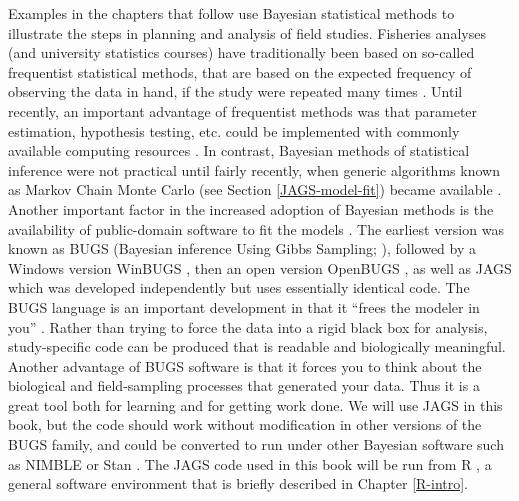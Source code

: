 \documentclass[
]{krantz}
\begin{document}
Examples in the chapters that follow use Bayesian statistical methods to illustrate the steps in planning and analysis of field studies. Fisheries analyses (and university statistics courses) have traditionally been based on so-called frequentist statistical methods, that are based on the expected frequency of observing the data in hand, if the study were repeated many times \citep{mccarthy2007}. Until recently, an important advantage of frequentist methods was that parameter estimation, hypothesis testing, etc. could be implemented with commonly available computing resources \citep{dorazio_2016}. In contrast, Bayesian methods of statistical inference were not practical until fairly recently, when generic algorithms known as Markov Chain Monte Carlo (see Section \ref{JAGS-model-fit}) became available \citep{dorazio_2016}. Another important factor in the increased adoption of Bayesian methods is the availability of public-domain software to fit the models \citep{kery.schaub_2011}. The earliest version was known as BUGS (Bayesian inference Using Gibbs Sampling; \citet{lunn.etal2009}), followed by a Windows version WinBUGS \citep{lunn.etal2000}, then an open version OpenBUGS \citep{lunn.etal2009}, as well as JAGS \citep{plummer2003} which was developed independently but uses essentially identical code. The BUGS language is an important development in that it ``frees the modeler in you'' \citep{kery_2010}. Rather than trying to force the data into a rigid black box for analysis, study-specific code can be produced that is readable and biologically meaningful. Another advantage of BUGS software is that it forces you to think about the biological and field-sampling processes that generated your data. Thus it is a great tool both for learning and for getting work done. We will use JAGS in this book, but the code should work without modification in other versions of the BUGS family, and could be converted to run under other Bayesian software such as NIMBLE \citep{ponisio.etal_2020} or Stan \citep{gelman.etal_2015}. The JAGS code used in this book will be run from R \citep{R-base}, a general software environment that is briefly described in Chapter \ref{R-intro}.
\end{document}
